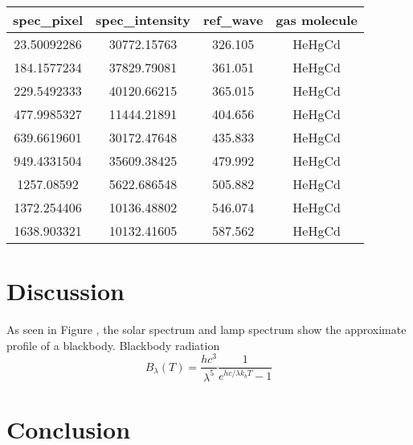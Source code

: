 \documentclass[preprint]{aastex62}
\begin{document}
\begin{table}[H]
    \begin{center}
    \begin{tabular}{|c|c|c|c|}
    \hline
    spec\_pixel & spec\_intensity & ref\_wave & gas molecule \\
    \hline \hline
    23.50092286 & 30772.15763     & 326.105   & HeHgCd  \\
    184.1577234 & 37829.79081     & 361.051   & HeHgCd  \\
    229.5492333 & 40120.66215     & 365.015   & HeHgCd  \\
    477.9985327 & 11444.21891     & 404.656   & HeHgCd  \\
    639.6619601 & 30172.47648     & 435.833   & HeHgCd  \\
    949.4331504 & 35609.38425     & 479.992   & HeHgCd  \\
    1257.08592  & 5622.686548     & 505.882   & HeHgCd  \\
    1372.254406 & 10136.48802     & 546.074   & HeHgCd  \\
    1638.903321 & 10132.41605     & 587.562   & HeHgCd  \\
    \hline
    \end{tabular}
    \end{center}
\end{table}



\section{Discussion} \label{sec:discussion}
As seen in Figure , the solar spectrum and lamp spectrum show the approximate profile of a blackbody. Blackbody radiation
\begin{equation}
    B_{\lambda}(T) = \frac{hc^3}{\lambda^5}\frac{1}{e^{hc/\lambda k_b T} - 1}
\end{equation}

\section{Conclusion}


\end{document}
